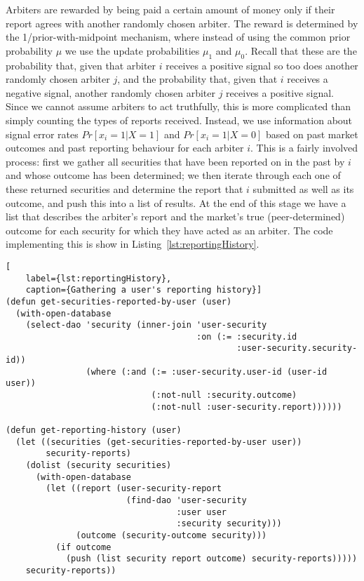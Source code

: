 Arbiters are rewarded by being paid a certain amount of money only if their
report agrees with another randomly chosen arbiter. The reward is determined by
the 1/prior-with-midpoint mechanism, where instead of using the common
prior probability $\mu$ we use the update probabilities $\mu_1$ and $\mu_0$.
Recall that these are the probability that, given that arbiter $i$ receives a
positive signal so too does another randomly chosen arbiter $j$, and the
probability that, given that $i$ receives a negative signal, another randomly
chosen arbiter $j$ receives a positive signal. Since we cannot assume arbiters
to act truthfully, this is more complicated than simply counting the types of
reports received. Instead, we use information about signal error rates
$Pr[x_i=1|X=1]$ and $Pr[x_i=1|X=0]$ based on past market outcomes and past
reporting behaviour for each arbiter $i$. This is a fairly involved process:
first we gather all securities that have been reported on in the past by $i$
and whose outcome has been determined; we then iterate through each one of
these returned securities and determine the report that $i$ submitted as well
as its outcome, and push this into a list of results. At the end of this stage
we have a list  that describes the
arbiter's report and the market's true (peer-determined) outcome for each
security for which they have acted as an arbiter. The code implementing this is
show in Listing~\ref{lst:reportingHistory}.

\begin{lstlisting}[
	label={lst:reportingHistory},
	caption={Gathering a user's reporting history}]
(defun get-securities-reported-by-user (user)
  (with-open-database
    (select-dao 'security (inner-join 'user-security
                                      :on (:= :security.id
                                              :user-security.security-id))
                (where (:and (:= :user-security.user-id (user-id user))
                             (:not-null :security.outcome)
                             (:not-null :user-security.report))))))

(defun get-reporting-history (user)
  (let ((securities (get-securities-reported-by-user user))
        security-reports)
	(dolist (security securities)
	  (with-open-database
	    (let ((report (user-security-report
	                    (find-dao 'user-security
	                              :user user
	                              :security security)))
              (outcome (security-outcome security)))
	      (if outcome
            (push (list security report outcome) security-reports)))))
	security-reports))
\end{lstlisting}

